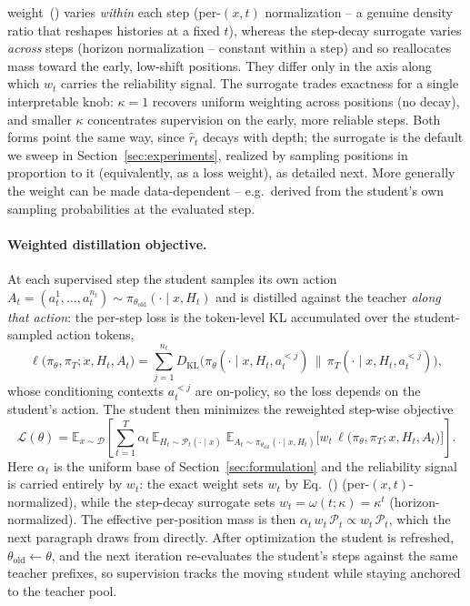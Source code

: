 weight~() varies \emph{within} each step (per-\((x,t)\)
normalization -- a genuine density ratio that reshapes histories at a fixed \(t\)),
whereas the step-decay surrogate varies \emph{across} steps (horizon normalization --
constant within a step) and so reallocates mass toward the early, low-shift positions.
They differ only in the axis along which \(w_t\) carries the reliability signal. The surrogate trades exactness for a single interpretable
knob: \(\kappa\!=\!1\) recovers uniform weighting across positions (no decay), and
smaller \(\kappa\) concentrates supervision on the early, more reliable steps. Both
forms point the same way, since \(\widehat r_t\) decays with depth; the surrogate is
the default we sweep in Section~\ref{sec:experiments}, realized by sampling positions
in proportion to it (equivalently, as a loss weight), as detailed next. More generally the weight can be
made data-dependent -- e.g.\ derived from the student's own sampling probabilities at
the evaluated step.

\paragraph{Weighted distillation objective.}
At each supervised step the student samples its own action
\(A_t=(a_t^1,\dots,a_t^{n_t})\sim\pi_{\theta_{\mathrm{old}}}(\cdot\mid x,H_t)\) and is
distilled against the teacher \emph{along that action}: the per-step loss is the
token-level KL accumulated over the student-sampled action tokens,
\[
\ell\big(\pi_\theta,\pi_T;x,H_t,A_t\big)
=
\sum_{j=1}^{n_t}
D_{\mathrm{KL}}\!\Big(
\pi_\theta(\cdot\mid x,H_t,a_t^{<j})
\,\big\|\,
\pi_T(\cdot\mid x,H_t,a_t^{<j})
\Big),
\]
whose conditioning contexts \(a_t^{<j}\) are on-policy, so the loss depends on the
student's action. The student then minimizes the reweighted step-wise objective
\[
\mathcal L(\theta)
=
\mathbb E_{x\sim\mathcal D}
\left[
\sum_{t=1}^{T}\alpha_t\,
\mathbb E_{H_t\sim\mathcal P_t(\cdot\mid x)}
\;
\mathbb E_{A_t\sim\pi_{\theta_{\mathrm{old}}}(\cdot\mid x,H_t)}
\Big[
w_t\,
\ell\big(\pi_\theta,\pi_T;x,H_t,A_t\big)
\Big]
\right].
\]
Here \(\alpha_t\) is the uniform base of Section~\ref{sec:formulation} and the
reliability signal is carried entirely by \(w_t\): the exact weight sets \(w_t\) by
Eq.~() (per-\((x,t)\)-normalized), while the step-decay
surrogate sets \(w_t=\omega(t;\kappa)=\kappa^{t}\) (horizon-normalized). The effective
per-position mass is then \(\alpha_t\,w_t\,\mathcal P_t\propto w_t\,\mathcal P_t\), which
the next paragraph draws from directly.
After optimization the student is refreshed, \(\theta_{\mathrm{old}}\leftarrow\theta\),
and the next iteration re-evaluates the student's steps against the same teacher
prefixes, so supervision tracks the moving student while staying anchored to the
teacher pool.

